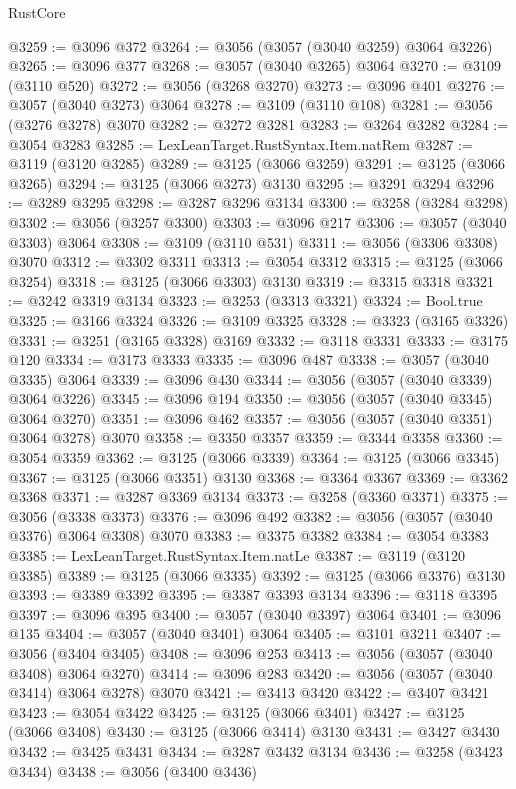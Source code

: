 \begin{lexlean}{RustCore}
\begin{coremodule}
@3259 := @3096 @372
@3264 := @3056 (@3057 (@3040 @3259) @3064 @3226)
@3265 := @3096 @377
@3268 := @3057 (@3040 @3265) @3064
@3270 := @3109 (@3110 @520)
@3272 := @3056 (@3268 @3270)
@3273 := @3096 @401
@3276 := @3057 (@3040 @3273) @3064
@3278 := @3109 (@3110 @108)
@3281 := @3056 (@3276 @3278) @3070
@3282 := @3272 @3281
@3283 := @3264 @3282
@3284 := @3054 @3283
@3285 := LexLeanTarget.RustSyntax.Item.natRem
@3287 := @3119 (@3120 @3285)
@3289 := @3125 (@3066 @3259)
@3291 := @3125 (@3066 @3265)
@3294 := @3125 (@3066 @3273) @3130
@3295 := @3291 @3294
@3296 := @3289 @3295
@3298 := @3287 @3296 @3134
@3300 := @3258 (@3284 @3298)
@3302 := @3056 (@3257 @3300)
@3303 := @3096 @217
@3306 := @3057 (@3040 @3303) @3064
@3308 := @3109 (@3110 @531)
@3311 := @3056 (@3306 @3308) @3070
@3312 := @3302 @3311
@3313 := @3054 @3312
@3315 := @3125 (@3066 @3254)
@3318 := @3125 (@3066 @3303) @3130
@3319 := @3315 @3318
@3321 := @3242 @3319 @3134
@3323 := @3253 (@3313 @3321)
@3324 := Bool.true
@3325 := @3166 @3324
@3326 := @3109 @3325
@3328 := @3323 (@3165 @3326)
@3331 := @3251 (@3165 @3328) @3169
@3332 := @3118 @3331
@3333 := @3175 @120
@3334 := @3173 @3333
@3335 := @3096 @487
@3338 := @3057 (@3040 @3335) @3064
@3339 := @3096 @430
@3344 := @3056 (@3057 (@3040 @3339) @3064 @3226)
@3345 := @3096 @194
@3350 := @3056 (@3057 (@3040 @3345) @3064 @3270)
@3351 := @3096 @462
@3357 := @3056 (@3057 (@3040 @3351) @3064 @3278) @3070
@3358 := @3350 @3357
@3359 := @3344 @3358
@3360 := @3054 @3359
@3362 := @3125 (@3066 @3339)
@3364 := @3125 (@3066 @3345)
@3367 := @3125 (@3066 @3351) @3130
@3368 := @3364 @3367
@3369 := @3362 @3368
@3371 := @3287 @3369 @3134
@3373 := @3258 (@3360 @3371)
@3375 := @3056 (@3338 @3373)
@3376 := @3096 @492
@3382 := @3056 (@3057 (@3040 @3376) @3064 @3308) @3070
@3383 := @3375 @3382
@3384 := @3054 @3383
@3385 := LexLeanTarget.RustSyntax.Item.natLe
@3387 := @3119 (@3120 @3385)
@3389 := @3125 (@3066 @3335)
@3392 := @3125 (@3066 @3376) @3130
@3393 := @3389 @3392
@3395 := @3387 @3393 @3134
@3396 := @3118 @3395
@3397 := @3096 @395
@3400 := @3057 (@3040 @3397) @3064
@3401 := @3096 @135
@3404 := @3057 (@3040 @3401) @3064
@3405 := @3101 @3211
@3407 := @3056 (@3404 @3405)
@3408 := @3096 @253
@3413 := @3056 (@3057 (@3040 @3408) @3064 @3270)
@3414 := @3096 @283
@3420 := @3056 (@3057 (@3040 @3414) @3064 @3278) @3070
@3421 := @3413 @3420
@3422 := @3407 @3421
@3423 := @3054 @3422
@3425 := @3125 (@3066 @3401)
@3427 := @3125 (@3066 @3408)
@3430 := @3125 (@3066 @3414) @3130
@3431 := @3427 @3430
@3432 := @3425 @3431
@3434 := @3287 @3432 @3134
@3436 := @3258 (@3423 @3434)
@3438 := @3056 (@3400 @3436)

\end{coremodule}
\end{lexlean}
